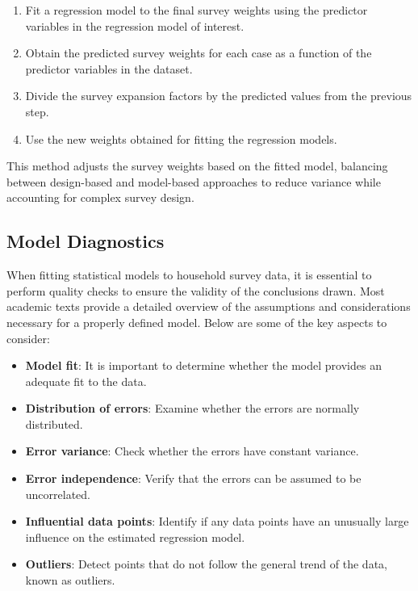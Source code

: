 \documentclass[
  12pt,
]{book}
\providecommand{\tightlist}{%
  \setlength{\itemsep}{0pt}\setlength{\parskip}{0pt}}
\begin{document}
\begin{enumerate}
\def\labelenumi{\arabic{enumi}.}
\tightlist
\item
  Fit a regression model to the final survey weights using the predictor variables in the regression model of interest.
\item
  Obtain the predicted survey weights for each case as a function of the predictor variables in the dataset.
\item
  Divide the survey expansion factors by the predicted values from the previous step.
\item
  Use the new weights obtained for fitting the regression models.
\end{enumerate}

This method adjusts the survey weights based on the fitted model, balancing between design-based and model-based approaches to reduce variance while accounting for complex survey design.

\subsection{Model Diagnostics}\label{model-diagnostics}

When fitting statistical models to household survey data, it is essential to perform quality checks to ensure the validity of the conclusions drawn. Most academic texts provide a detailed overview of the assumptions and considerations necessary for a properly defined model. Below are some of the key aspects to consider:

\begin{itemize}
\tightlist
\item
  \textbf{Model fit}: It is important to determine whether the model provides an adequate fit to the data.
\item
  \textbf{Distribution of errors}: Examine whether the errors are normally distributed.
\item
  \textbf{Error variance}: Check whether the errors have constant variance.
\item
  \textbf{Error independence}: Verify that the errors can be assumed to be uncorrelated.
\item
  \textbf{Influential data points}: Identify if any data points have an unusually large influence on the estimated regression model.
\item
  \textbf{Outliers}: Detect points that do not follow the general trend of the data, known as outliers.
\end{itemize}
\end{document}
